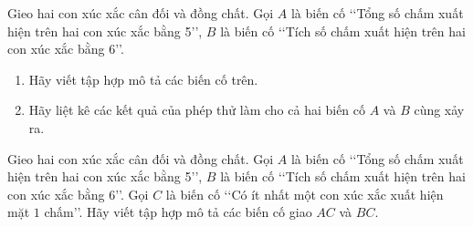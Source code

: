 \begin{bt}
	Gieo hai con xúc xắc cân đối và đồng chất. Gọi $A$ là biến cố \lq\lq Tổng số chấm xuất hiện trên hai con xúc xắc bằng 5\rq\rq, $B$ là biến cố \lq\lq Tích số chấm xuất hiện trên hai con xúc xắc bằng 6\rq\rq.
	\begin{enumerate}
	\item Hãy viết tập hợp mô tả các biến cố trên.
	\item Hãy liệt kê các kết quả của phép thử làm cho cả hai biến cố $A$ và $B$ cùng xảy ra.
	\end{enumerate}
\end{bt}
\begin{bt}
	Gieo hai con xúc xắc cân đối và đồng chất. Gọi $A$ là biến cố \lq\lq Tổng số chấm xuất hiện trên hai con xúc xắc bằng 5\rq\rq, $B$ là biến cố \lq\lq Tích số chấm xuất hiện trên hai con xúc xắc bằng 6\rq\rq. Gọi $C$ là biến cố \lq\lq Có ít nhất một con xúc xắc xuất hiện mặt $1$ chấm\rq\rq. Hãy viết tập hợp mô tả các biến cố giao $AC$ và $BC$.
\end{bt}
